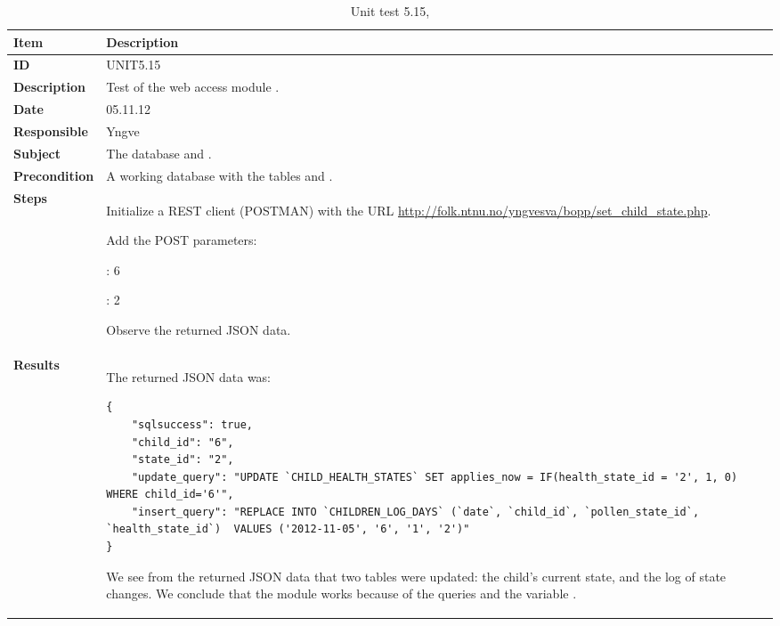 \begin{table} %
	\begin{center}
		\begin{tabular}{|p{3.0cm}|p{14.0cm}|}
			\hline
			\bf{Item} & \bf{Description}\\
			\hline
			\bf{ID} & UNIT5.15\\
			\bf{Description} & Test of the web access module \code{set\_child\_state.php}.\\
			\bf{Date} & 05.11.12\\
			\bf{Responsible} & Yngve\\
			\bf{Subject} & The database and \code{set\_child\_state.php}.\\
			\bf{Precondition} & A working database with the tables \code{CHILD\_HEALTH\_STATES} and \code{CHILDREN\_LOG\_DAYS}.\\
			\bf{Steps} &
			\begin{tabulenum}
				\item Initialize a REST client (POSTMAN) with the URL \url{http://folk.ntnu.no/yngvesva/bopp/set\_child\_state.php}.
				\item Add the POST parameters:
					\begin{tabulitem}
					  \item \code{child\_id}: 6
					  \item \code{state\_id}: 2
					\end{tabulitem}
				\item Observe the returned JSON data.
			\end{tabulenum}\\
			\hline
			\bf{Results} & The returned JSON data was:
\begin{lstlisting}[caption=Returned JSON from \code{set\_child\_state.php}]
{
    "sqlsuccess": true,
    "child_id": "6",
    "state_id": "2",
    "update_query": "UPDATE `CHILD_HEALTH_STATES` SET applies_now = IF(health_state_id = '2', 1, 0) WHERE child_id='6'",
    "insert_query": "REPLACE INTO `CHILDREN_LOG_DAYS` (`date`, `child_id`, `pollen_state_id`, `health_state_id`)  VALUES ('2012-11-05', '6', '1', '2')"
}
\end{lstlisting}
			We see from the returned JSON data that two tables were updated: the child's current
			state, and the log of state changes. We conclude that the module works because of
			the queries and the variable \code{sqlsuccess}.
			\\
			\hline
		\end{tabular}
	\end{center}
	\caption{Unit test 5.15, }
	\label{tab:unit5.15}
\end{table}


